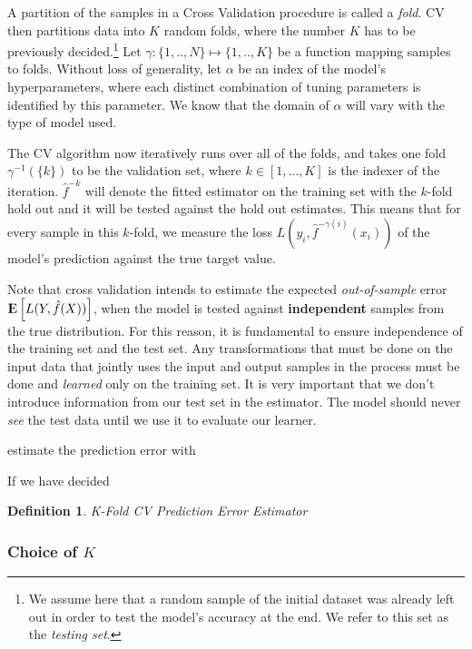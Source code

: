 \documentclass{article}%
\newcommand{\Expect}{{\rm I\kern-.3em E}}
\newtheorem{definition}{Definition}[subsection]
\theoremstyle{definition}
\begin{document}
 A partition of the samples in a Cross Validation procedure is called a \textit{fold}. CV then partitions data into $K$ random folds, where the number $K$ has to be previously decided.\footnote{ We assume here that a random sample of the initial dataset was already left out in order to test the model's accuracy at the end. We refer to this set as the \textit{testing set}.} Let $\gamma : \{1,..,N\} \mapsto \{1, .., K\}$ be a function mapping samples to folds. Without loss of generality,  let $\alpha$ be an index of the model's hyperparameters, where each distinct combination of tuning parameters is identified by this parameter. We know that the domain of $\alpha$ will vary with the type of model used. 
 
 The CV algorithm now iteratively runs over all of the folds, and takes one fold $\gamma^{-1}(\{k\})$ to be the validation set, where $k \in [1,...,K]$ is the indexer of the iteration. $\hat{f}^{-k}$ will denote the fitted estimator on the training set with the $k$-fold hold out and it will be tested against the hold out estimates. This means that for every sample in this $k$-fold, we measure the loss $L(y_i, \hat{f}^{-\gamma(i)}(x_i))$ of the model's prediction against the true target value.
 
 Note that cross validation intends to estimate the expected \textit{out-of-sample} error $\Expect \left[  L(Y, \hat{f}(X)) \right]$, when the model is tested against \textbf{independent} samples from the true distribution. For this reason, it is fundamental to ensure independence of the training set and the test set. Any transformations that must be done on the input data that jointly uses the input and output samples in the process must be done and \textit{learned} only on the training set. It is very important that we don't introduce information from our test set in the estimator. The model should never \textit{see} the test data until we use it to evaluate our learner. 
 
 
 estimate the prediction error with
 
 
 
 If we have decided 
 
 
 
 \begin{definition}{K-Fold CV Prediction Error Estimator}
 	
 \end{definition}
 
 \subsubsection{Choice of $K$} 
 
\end{document}

